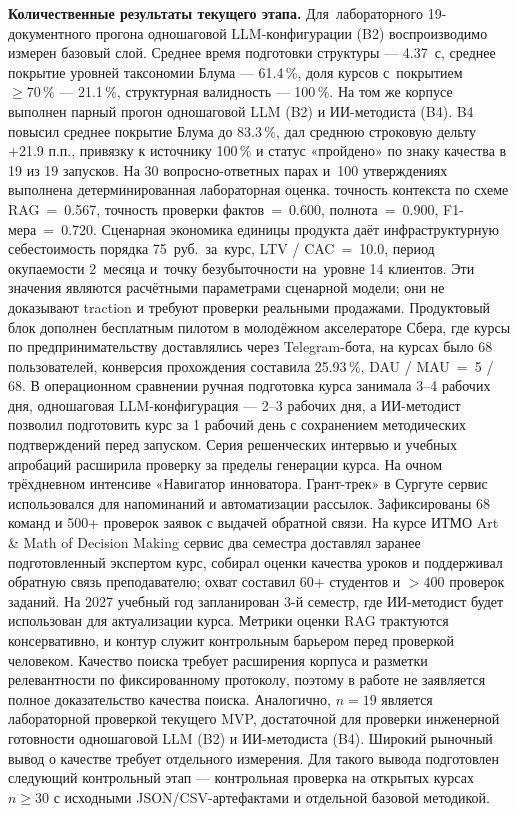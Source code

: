 \textbf{Количественные результаты текущего этапа.}
Для~лабораторного 19-документного прогона одношаговой LLM-конфигурации (B2)
воспроизводимо измерен базовый слой. Среднее время подготовки структуры — 4.37~с,
среднее покрытие уровней таксономии Блума — 61.4\,\%, доля курсов
с~покрытием $\geq 70\,\%$ — 21.1\,\%, структурная валидность —
100\,\%. На том же корпусе выполнен парный прогон одношаговой LLM (B2)
и ИИ-методиста (B4). B4 повысил среднее покрытие Блума до 83.3\,\%, дал среднюю
строковую дельту +21.9 п.п., привязку к источнику 100\,\% и статус
«пройдено» по знаку качества в 19 из 19 запусков. На 30 вопросно-ответных парах
и~100 утверждениях выполнена детерминированная лабораторная оценка.
точность контекста по схеме RAG~=~0.567, точность проверки фактов~=~0.600,
полнота~=~0.900, F1-мера~=~0.720. Сценарная экономика единицы продукта даёт
инфраструктурную себестоимость порядка 75~руб.\ за~курс,
LTV / CAC~=~10.0, период окупаемости 2~месяца и~точку безубыточности
на~уровне 14 клиентов. Эти значения являются расчётными параметрами
сценарной модели; они не доказывают traction и требуют проверки
реальными продажами.
Продуктовый блок дополнен бесплатным пилотом в молодёжном акселераторе
Сбера, где курсы по предпринимательству доставлялись через Telegram-бота,
на курсах было 68 пользователей, конверсия прохождения составила
25.93\,\%, DAU / MAU~=~5 / 68. В операционном сравнении ручная подготовка
курса занимала 3–4 рабочих дня, одношаговая LLM-конфигурация — 2–3
рабочих дня, а ИИ-методист позволил подготовить курс за 1 рабочий день
с сохранением методических подтверждений перед запуском.
Серия решенческих интервью и учебных апробаций расширила проверку за пределы
генерации курса. На очном трёхдневном интенсиве «Навигатор инноватора.
Грант-трек» в Сургуте сервис использовался для напоминаний и автоматизации
рассылок. Зафиксированы 68 команд и 500+ проверок заявок с выдачей обратной
связи. На курсе ИТМО Art \& Math of Decision Making сервис два семестра
доставлял заранее подготовленный экспертом курс, собирал оценки качества
уроков и поддерживал обратную связь преподавателю; охват составил
60+ студентов и $>400$ проверок заданий. На 2027 учебный год запланирован
3-й семестр, где ИИ-методист будет использован для актуализации курса.
Метрики оценки RAG трактуются консервативно, и контур служит контрольным
барьером перед проверкой человеком. Качество поиска требует
расширения корпуса и разметки релевантности по фиксированному протоколу,
поэтому в работе не заявляется полное доказательство качества поиска.
Аналогично, $n = 19$ является лабораторной проверкой текущего
MVP, достаточной для проверки инженерной готовности одношаговой LLM (B2)
и ИИ-методиста (B4). Широкий рыночный вывод о качестве требует
отдельного измерения.
Для такого вывода подготовлен следующий контрольный этап —
контрольная проверка на открытых курсах $n \geq 30$ с исходными
JSON/CSV-артефактами и отдельной базовой методикой.


